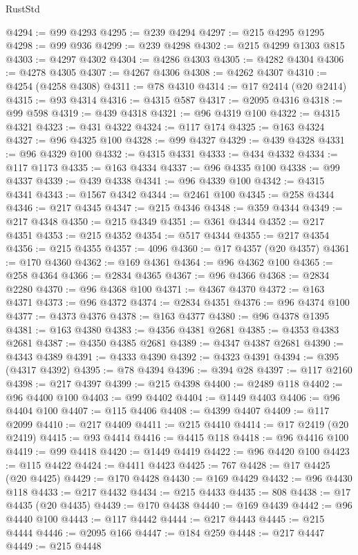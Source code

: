 \begin{lexlean}{RustStd}
\begin{coremodule}
@4294 := @99 @4293
@4295 := @239 @4294
@4297 := @215 @4295 @1295
@4298 := @99 @936
@4299 := @239 @4298
@4302 := @215 @4299 @1303 @815
@4303 := @4297 @4302
@4304 := @4286 @4303
@4305 := @4282 @4304
@4306 := @4278 @4305
@4307 := @4267 @4306
@4308 := @4262 @4307
@4310 := @4254 (@4258 @4308)
@4311 := @78 @4310
@4314 := @17 @2414 (@20 @2414)
@4315 := @93 @4314
@4316 := @4315 @587
@4317 := @2095 @4316
@4318 := @99 @598
@4319 := @439 @4318
@4321 := @96 @4319 @100
@4322 := @4315 @4321
@4323 := @431 @4322
@4324 := @117 @174
@4325 := @163 @4324
@4327 := @96 @4325 @100
@4328 := @99 @4327
@4329 := @439 @4328
@4331 := @96 @4329 @100
@4332 := @4315 @4331
@4333 := @434 @4332
@4334 := @117 @1173
@4335 := @163 @4334
@4337 := @96 @4335 @100
@4338 := @99 @4337
@4339 := @439 @4338
@4341 := @96 @4339 @100
@4342 := @4315 @4341
@4343 := @1567 @4342
@4344 := @2461 @100
@4345 := @258 @4344
@4346 := @217 @4345
@4347 := @215 @4346
@4348 := @359 @4344
@4349 := @217 @4348
@4350 := @215 @4349
@4351 := @361 @4344
@4352 := @217 @4351
@4353 := @215 @4352
@4354 := @517 @4344
@4355 := @217 @4354
@4356 := @215 @4355
@4357 := 4096
@4360 := @17 @4357 (@20 @4357)
@4361 := @170 @4360
@4362 := @169 @4361
@4364 := @96 @4362 @100
@4365 := @258 @4364
@4366 := @2834 @4365
@4367 := @96 @4366
@4368 := @2834 @2280
@4370 := @96 @4368 @100
@4371 := @4367 @4370
@4372 := @163 @4371
@4373 := @96 @4372
@4374 := @2834 @4351
@4376 := @96 @4374 @100
@4377 := @4373 @4376
@4378 := @163 @4377
@4380 := @96 @4378 @1395
@4381 := @163 @4380
@4383 := @4356 @4381 @2681
@4385 := @4353 @4383 @2681
@4387 := @4350 @4385 @2681
@4389 := @4347 @4387 @2681
@4390 := @4343 @4389
@4391 := @4333 @4390
@4392 := @4323 @4391
@4394 := @395 (@4317 @4392)
@4395 := @78 @4394
@4396 := @394 @28
@4397 := @117 @2160
@4398 := @217 @4397
@4399 := @215 @4398
@4400 := @2489 @118
@4402 := @96 @4400 @100
@4403 := @99 @4402
@4404 := @1449 @4403
@4406 := @96 @4404 @100
@4407 := @115 @4406
@4408 := @4399 @4407
@4409 := @117 @2099
@4410 := @217 @4409
@4411 := @215 @4410
@4414 := @17 @2419 (@20 @2419)
@4415 := @93 @4414
@4416 := @4415 @118
@4418 := @96 @4416 @100
@4419 := @99 @4418
@4420 := @1449 @4419
@4422 := @96 @4420 @100
@4423 := @115 @4422
@4424 := @4411 @4423
@4425 := 767
@4428 := @17 @4425 (@20 @4425)
@4429 := @170 @4428
@4430 := @169 @4429
@4432 := @96 @4430 @118
@4433 := @217 @4432
@4434 := @215 @4433
@4435 := 808
@4438 := @17 @4435 (@20 @4435)
@4439 := @170 @4438
@4440 := @169 @4439
@4442 := @96 @4440 @100
@4443 := @117 @4442
@4444 := @217 @4443
@4445 := @215 @4444
@4446 := @2095 @166
@4447 := @184 @259
@4448 := @217 @4447
@4449 := @215 @4448

\end{coremodule}
\end{lexlean}

